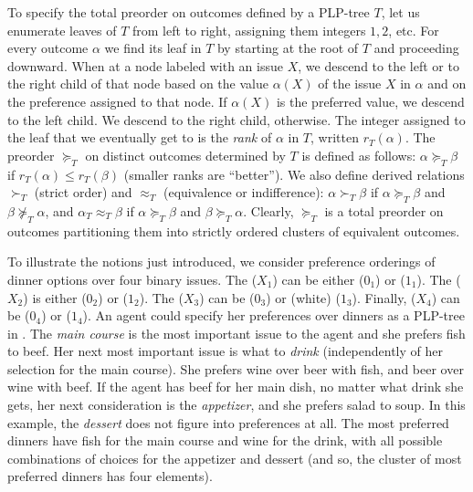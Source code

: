 To specify the total preorder on outcomes defined by a PLP-tree $T$, let 
us enumerate leaves of $T$ from left to right, assigning them 
integers $1,2$, etc. For every outcome $\alpha$ we find its leaf 
in $T$ by starting at the root of $T$ and proceeding downward.
When at a node labeled with an issue $X$, we descend to the left or to the 
right child of that node based on the value $\alpha(X)$ of the issue $X$ 
in $\alpha$ and on the preference assigned to that node. If $\alpha(X)$ is 
the preferred value, we descend to the left child. We descend to the right
child,
otherwise. The integer assigned to the leaf that we eventually get 
to is the \emph{rank} 
of $\alpha$ in $T$, written $r_T(\alpha)$. The preorder $\succeq_T$ on 
distinct outcomes determined by $T$ is defined as follows: $\alpha\succeq_T \beta$ 
if $r_T(\alpha)\leq r_T(\beta)$ (smaller ranks are ``better''). We also 
define derived relations $\succ_T$ (strict order) and $\approx_T$ 
(equivalence or indifference): $\alpha \succ_T\beta$ if $\alpha\succeq_T
\beta$ and $\beta \not\succeq_T \alpha$, and $\alpha_T\approx_T\beta$ if 
$\alpha\succeq_T\beta$ and $\beta\succeq_T \alpha$. Clearly, $\succeq_T$ 
is a total preorder on outcomes partitioning them into strictly ordered 
clusters of equivalent outcomes. 

To illustrate the notions just introduced, we consider preference orderings 
of dinner options over four binary issues. The  ($X_1$) can 
be either  ($0_1$) or  ($1_1$). The  
($X_2$)
is either  ($0_2$) or  ($1_2$).
The  ($X_3$) can be  ($0_3$) or (white)  
($1_3$). Finally,  ($X_4$) can be  ($0_4$)
or  ($1_4$).
An agent could specify her preferences over dinners as a PLP-tree in 
. The \emph{main course} is the most important issue to 
the agent and she prefers fish to beef. Her next most important issue is 
what to \emph{drink} (independently of her selection for the main course). She 
prefers wine over beer with fish, and beer over wine with beef. If the
agent has beef for her main dish, no matter what drink she gets, her next 
consideration is the \emph{appetizer}, and she prefers salad to soup.
In this example, the \emph{dessert} does not figure into preferences at all.
The most preferred dinners have fish for the main course and wine for the 
drink, with all possible combinations of choices for the appetizer and 
dessert (and so, the cluster of most preferred dinners has four elements).

